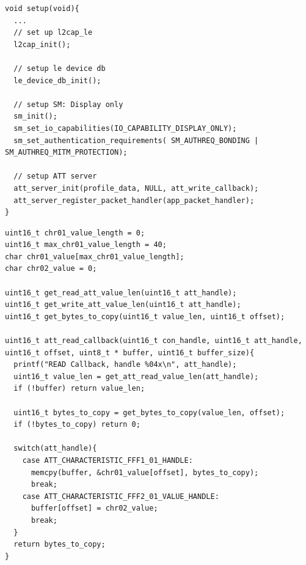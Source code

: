 \documentclass[a4paper,titlepage,oneside,12pt]{amsart} %
\begin{document}
\begin{lstlisting}[caption= Setting up LE peripheral., label=code:lePeripheralSetup]
void setup(void){
  ...
  // set up l2cap_le
  l2cap_init();
    
  // setup le device db
  le_device_db_init();

  // setup SM: Display only
  sm_init();
  sm_set_io_capabilities(IO_CAPABILITY_DISPLAY_ONLY);
  sm_set_authentication_requirements( SM_AUTHREQ_BONDING | SM_AUTHREQ_MITM_PROTECTION); 

  // setup ATT server
  att_server_init(profile_data, NULL, att_write_callback);  
  att_server_register_packet_handler(app_packet_handler);
}
\end{lstlisting}


\begin{lstlisting}[caption= Read callback ., label=code:lePeripheralReadCallback]
uint16_t chr01_value_length = 0;
uint16_t max_chr01_value_length = 40;
char chr01_value[max_chr01_value_length];
char chr02_value = 0;

uint16_t get_read_att_value_len(uint16_t att_handle);
uint16_t get_write_att_value_len(uint16_t att_handle);
uint16_t get_bytes_to_copy(uint16_t value_len, uint16_t offset);

uint16_t att_read_callback(uint16_t con_handle, uint16_t att_handle, uint16_t offset, uint8_t * buffer, uint16_t buffer_size){
  printf("READ Callback, handle %04x\n", att_handle);
  uint16_t value_len = get_att_read_value_len(att_handle);
  if (!buffer) return value_len;
      
  uint16_t bytes_to_copy = get_bytes_to_copy(value_len, offset);
  if (!bytes_to_copy) return 0;
  
  switch(att_handle){
    case ATT_CHARACTERISTIC_FFF1_01_HANDLE:
      memcpy(buffer, &chr01_value[offset], bytes_to_copy);
      break;
    case ATT_CHARACTERISTIC_FFF2_01_VALUE_HANDLE:
      buffer[offset] = chr02_value;
      break;
  }
  return bytes_to_copy;
}
\end{lstlisting}
\end{document}
